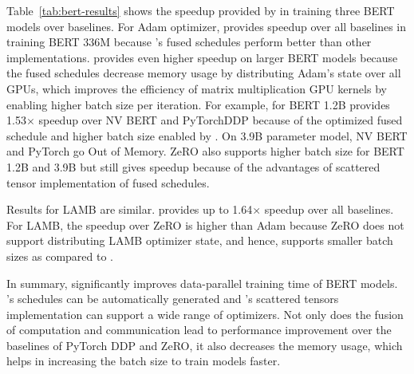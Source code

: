  Table~\ref{tab:bert-results} shows the speedup provided by \tool in training three BERT models over baselines.
For Adam optimizer, \tool provides speedup over all baselines in training BERT 336M because \tool's fused schedules perform better than other implementations.
\tool provides even higher speedup on larger BERT models because the fused schedules decrease memory usage by distributing Adam's state over all GPUs, which improves the efficiency of matrix multiplication GPU kernels by enabling higher batch size per iteration.
For example, for BERT 1.2B \tool provides 1.53$\times$ speedup over NV BERT and PyTorchDDP because of the optimized fused schedule and higher batch size enabled by \tool.
On 3.9B parameter model, NV BERT and PyTorch go Out of Memory.
ZeRO also supports higher batch size for BERT 1.2B and 3.9B but \tool still gives speedup because of the advantages of scattered tensor implementation of fused schedules.

Results for LAMB are similar. 
\tool provides up to 1.64$\times$ speedup over all baselines. 
For LAMB, the speedup over ZeRO is higher than Adam because ZeRO does not support distributing LAMB optimizer state, and hence, supports smaller batch sizes as compared to \tool.

In summary, \tool significantly improves data-parallel training time of BERT models. 
\tool's schedules can be automatically generated and \tool's scattered tensors implementation can support a  wide range of optimizers.
Not only does the fusion of computation and communication lead to performance improvement over the baselines of PyTorch DDP and ZeRO, it also decreases the memory usage, which helps in increasing the batch size to train models faster.


